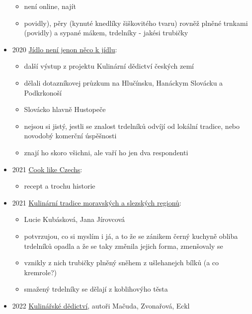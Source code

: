 \begin{itemize}
  \begin{itemize}
  \tightlist
  \item
    není online, najít
  \item
    povidly), pěry (kynuté knedlíky šiškovitého tvaru) rovněž plněné
    trnkami (povidly) a sypané mákem, trdelníky - jakési trubičky
  \end{itemize}
\item
  2020
  \href{https://kulturni-dejiny.slu.cz/data/uploads/067/upvysledky/jidlo-neni-jenom_odborna-kniha_uplatnny_2020.pdf}{Jídlo
  není jenon něco k jídlu}:

  \begin{itemize}
  \tightlist
  \item
    další výstup z projektu Kulinární dědictví českých zemí
  \item
    dělali dotazníkovej průzkum na Hlučínsku, Hanáckym Slovácku a
    Podkrkonoší
  \item
    Slovácko hlavně Hustopeče
  \item
    nejsou si jistý, jestli se znalost trdelníků odvíjí od lokální
    tradice, nebo novodobý komerční úspěšnosti
  \item
    znají ho skoro všichni, ale vaří ho jen dva respondenti
  \end{itemize}
\item
  2021 \href{https://www.cooklikeczechs.com/trdelnik/}{Cook like
  Czechs}:

  \begin{itemize}
  \tightlist
  \item
    recept a trochu historie
  \end{itemize}
\item
  2021
  \href{https://www.nzm.cz/o-nas/veda-a-vyzkum/publikacni-cinnost/odborne-publikace/kulinarni-tradice-moravskych-a-slezskych-regionu}{Kulinární
  tradice moravských a slezských regionů}:

  \begin{itemize}
  \tightlist
  \item
    Lucie Kubásková, Jana Jírovcová
  \item
    potvrzujou, co si myslím i já, a to že se zánikem černý kuchyně
    obliba trdelníků opadla a že se taky změnila jejich forma,
    zmenšovaly se
  \item
    vznikly z nich trubičky plněný sněhem z ušlehanejch bílků (a co
    kremrole?)
  \item
    smažený trdelníky se dělají z koblihovýho těsta
  \end{itemize}
\item
  2022
  \href{https://wirtschaftsmuseum.at/media/downloads/Interreg/Kucharka_Kochbuch_WEB.pdf}{Kulinářské
  dědictví}, autoři Mačuda, Zvonařová, Eckl


\end{itemize}

